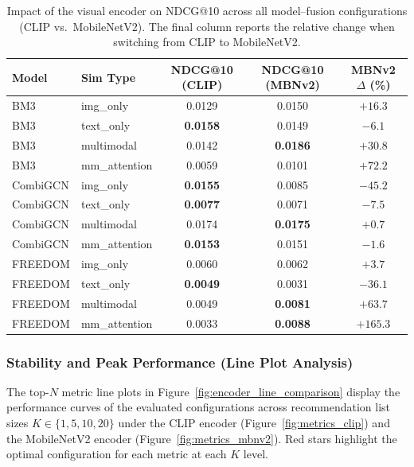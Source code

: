 \begin{table}[H]
\centering
\caption{Impact of the visual encoder on NDCG@10 across all model--fusion configurations (CLIP vs.\ MobileNetV2). The final column reports the relative change when switching from CLIP to MobileNetV2.}
\label{tab:encoder_comparison}
\small
\setlength{\tabcolsep}{6pt}
\begin{tabular}{llccc}
\hline
\textbf{Model} & \textbf{Sim Type} & \textbf{NDCG@10 (CLIP)} & \textbf{NDCG@10 (MBNv2)} & \textbf{MBNv2 $\Delta$ (\%)} \\ \hline
BM3 & img\_only & 0.0129 & 0.0150 & $+16.3$ \\
BM3 & text\_only & \textbf{0.0158} & 0.0149 & $-6.1$ \\
BM3 & multimodal & 0.0142 & \textbf{0.0186} & $+30.8$ \\
BM3 & mm\_attention & 0.0059 & 0.0101 & $+72.2$ \\ \hline
CombiGCN & img\_only & \textbf{0.0155} & 0.0085 & $-45.2$ \\
CombiGCN & text\_only & \textbf{0.0077} & 0.0071 & $-7.5$ \\
CombiGCN & multimodal & 0.0174 & \textbf{0.0175} & $+0.7$ \\
CombiGCN & mm\_attention & \textbf{0.0153} & 0.0151 & $-1.6$ \\ \hline
FREEDOM & img\_only & 0.0060 & 0.0062 & $+3.7$ \\
FREEDOM & text\_only & \textbf{0.0049} & 0.0031 & $-36.1$ \\
FREEDOM & multimodal & 0.0049 & \textbf{0.0081} & $+63.7$ \\
FREEDOM & mm\_attention & 0.0033 & \textbf{0.0088} & $+165.3$ \\ \hline
\end{tabular}
\end{table}

\subsubsection{Stability and Peak Performance (Line Plot Analysis)}

The top-$N$ metric line plots in Figure~\ref{fig:encoder_line_comparison} display the performance curves of the evaluated configurations across recommendation list sizes $K \in \{1, 5, 10, 20\}$ under the CLIP encoder (Figure~\ref{fig:metrics_clip}) and the MobileNetV2 encoder (Figure~\ref{fig:metrics_mbnv2}). Red stars highlight the optimal configuration for each metric at each $K$ level.

